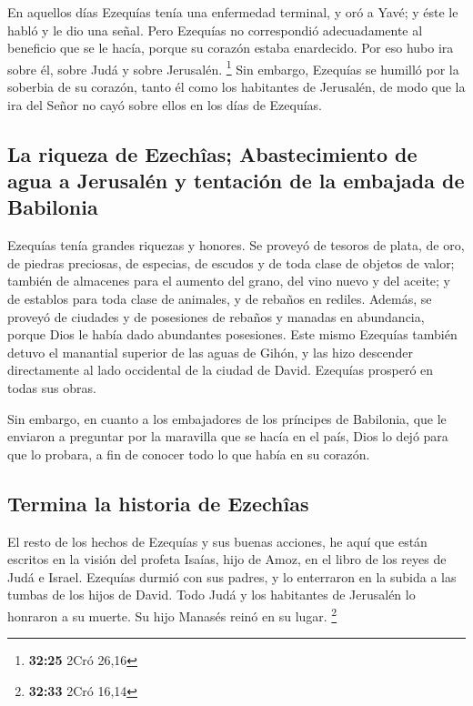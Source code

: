  En aquellos días Ezequías tenía una enfermedad terminal,
y oró a Yavé; y éste le habló y le dio una señal.  Pero
Ezequías no correspondió adecuadamente al beneficio que se le hacía,
porque su corazón estaba enardecido. Por eso hubo ira sobre él, sobre
Judá y sobre Jerusalén. \footnote{\textbf{32:25} 2Cró 26,16}
 Sin embargo, Ezequías se humilló por la soberbia de su
corazón, tanto él como los habitantes de Jerusalén, de modo que la ira
del Señor no cayó sobre ellos en los días de Ezequías.

\hypertarget{la-riqueza-de-ezechuxeeas-abastecimiento-de-agua-a-jerusaluxe9n-y-tentaciuxf3n-de-la-embajada-de-babilonia}{%
\subsection{La riqueza de Ezechîas; Abastecimiento de agua a Jerusalén y
tentación de la embajada de
Babilonia}\label{la-riqueza-de-ezechuxeeas-abastecimiento-de-agua-a-jerusaluxe9n-y-tentaciuxf3n-de-la-embajada-de-babilonia}}

 Ezequías tenía grandes riquezas y honores. Se proveyó de
tesoros de plata, de oro, de piedras preciosas, de especias, de escudos
y de toda clase de objetos de valor;  también de
almacenes para el aumento del grano, del vino nuevo y del aceite; y de
establos para toda clase de animales, y de rebaños en rediles.
 Además, se proveyó de ciudades y de posesiones de
rebaños y manadas en abundancia, porque Dios le había dado abundantes
posesiones.  Este mismo Ezequías también detuvo el
manantial superior de las aguas de Gihón, y las hizo descender
directamente al lado occidental de la ciudad de David. Ezequías prosperó
en todas sus obras.

 Sin embargo, en cuanto a los embajadores de los
príncipes de Babilonia, que le enviaron a preguntar por la maravilla que
se hacía en el país, Dios lo dejó para que lo probara, a fin de conocer
todo lo que había en su corazón.

\hypertarget{termina-la-historia-de-ezechuxeeas}{%
\subsection{Termina la historia de
Ezechîas}\label{termina-la-historia-de-ezechuxeeas}}

 El resto de los hechos de Ezequías y sus buenas
acciones, he aquí que están escritos en la visión del profeta Isaías,
hijo de Amoz, en el libro de los reyes de Judá e Israel. 
Ezequías durmió con sus padres, y lo enterraron en la subida a las
tumbas de los hijos de David. Todo Judá y los habitantes de Jerusalén lo
honraron a su muerte. Su hijo Manasés reinó en su lugar. \footnote{\textbf{32:33}
  2Cró 16,14}

